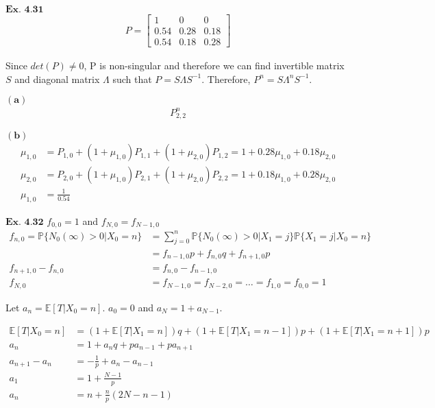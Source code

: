 \documentclass{article}
\begin{document}
\vspace{0.2in}
${\textbf{Ex. 4.31}}$
\begin{align*}
P = \begin{bmatrix}1 & 0 & 0\\0.54&0.28&0.18\\0.54&0.18&0.28\end{bmatrix}
\end{align*}

Since $det(P) \neq 0$, P is non-singular and therefore we can find invertible matrix $S$ and diagonal matrix $\Lambda$ such that $P = S\Lambda S^{-1}$. Therefore, $P^{n} = S\Lambda^{n}S^{-1}$.

$\mathbf{(a)}$
\begin{align*}
P^{n}_{2,2}
\end{align*}

$\mathbf{(b)}$
\begin{align*}
\mu_{1,0} &= P_{1,0} + (1+\mu_{1,0})P_{1,1} + (1+\mu_{2,0})P_{1,2} = 1+0.28\mu_{1,0}+0.18\mu_{2,0}\\
\mu_{2,0} &= P_{2,0} + (1+\mu_{1,0})P_{2,1} + (1+\mu_{2,0})P_{2,2} = 1+0.18\mu_{1,0}+0.28\mu_{2,0}\\
\mu_{1,0} &= \frac{1}{0.54}
\end{align*}

\vspace{0.2in}
${\textbf{Ex. 4.32}}$
$f_{0,0} = 1$ and $f_{N,0} = f_{N-1,0}$
\begin{align*}
f_{n,0} = \mathbb{P}\{N_0(\infty)>0|X_0=n\} &= \sum_{j=0}^{n}\mathbb{P}\{N_0(\infty)>0|X_1=j\}\mathbb{P}\{X_1=j|X_0=n\}\\
&= f_{n-1,0}p + f_{n,0}q + f_{n+1,0}p\\
f_{n+1,0}-f_{n,0} &= f_{n,0}-f_{n-1,0}\\
f_{N,0} &= f_{N-1,0} = f_{N-2,0} = \ldots = f_{1,0} = f_{0,0} = 1
\end{align*}

Let $a_n = \mathbb{E}[T|X_0=n]$. $a_0 = 0$ and $a_N = 1+a_{N-1}$. 

\begin{align*}
\mathbb{E}[T|X_0=n] &= (1+\mathbb{E}[T|X_1=n])q + (1+\mathbb{E}[T|X_1=n-1])p + (1+\mathbb{E}[T|X_1=n+1])p\\
a_n &= 1 + a_{n}q + p a_{n-1} + pa_{n+1}\\
a_{n+1}-a_{n} &= -\frac{1}{p} + a_{n}-a_{n-1}\\
a_1 &= 1+\frac{N-1}{p}\\
a_n &= n + \frac{n}{p}(2N - n - 1)
\end{align*}
\end{document}
